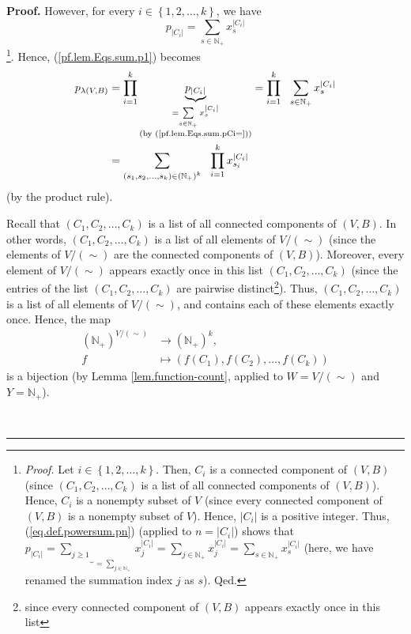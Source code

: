 \documentclass[numbers=enddot,12pt,final,onecolumn,notitlepage]{scrartcl}%
\theoremstyle{definition}
\newenvironment{proof}[1][Proof]{\noindent\textbf{#1.} }{\ \rule{0.5em}{0.5em}}
\newenvironment{verlong}{}{}
\let\sumnonlimits\sum
\let\prodnonlimits\prod
\renewcommand{\sum}{\sumnonlimits\limits}
\renewcommand{\prod}{\prodnonlimits\limits}
\begin{document}
\begin{verlong}
\begin{proof}
However, for every $i\in\left\{  1,2,\ldots,k\right\}  $, we have
\begin{equation}
p_{\left\vert C_{i}\right\vert }=\sum_{s\in\mathbb{N}_{+}}x_{s}^{\left\vert
C_{i}\right\vert } \label{pf.lem.Eqs.sum.pCi=}%
\end{equation}
\footnote{\textit{Proof.} Let $i\in\left\{  1,2,\ldots,k\right\}  $. Then,
$C_{i}$ is a connected component of $\left(  V,B\right)  $ (since $\left(
C_{1},C_{2},\ldots,C_{k}\right)  $ is a list of all connected components of
$\left(  V,B\right)  $). Hence, $C_{i}$ is a nonempty subset of $V$ (since
every connected component of $\left(  V,B\right)  $ is a nonempty subset of
$V$). Hence, $\left\vert C_{i}\right\vert $ is a positive integer. Thus,
(\ref{eq.def.powersum.pn}) (applied to $n=\left\vert C_{i}\right\vert $) shows
that $p_{\left\vert C_{i}\right\vert }=\underbrace{\sum_{j\geq1}}_{=\sum
_{j\in\mathbb{N}_{+}}}x_{j}^{\left\vert C_{i}\right\vert }=\sum_{j\in
\mathbb{N}_{+}}x_{j}^{\left\vert C_{i}\right\vert }=\sum_{s\in\mathbb{N}_{+}%
}x_{s}^{\left\vert C_{i}\right\vert }$ (here, we have renamed the summation
index $j$ as $s$). Qed.}. Hence, (\ref{pf.lem.Eqs.sum.p1}) becomes%
\begin{align}
p_{\lambda\left(  V,B\right)  }  &  =\prod_{i=1}^{k}\underbrace{p_{\left\vert
C_{i}\right\vert }}_{\substack{=\sum_{s\in\mathbb{N}_{+}}x_{s}^{\left\vert
C_{i}\right\vert }\\\text{(by (\ref{pf.lem.Eqs.sum.pCi=}))}}}=\prod_{i=1}%
^{k}\ \ \sum_{s\in\mathbb{N}_{+}}x_{s}^{\left\vert C_{i}\right\vert
}\nonumber\\
&  =\sum_{\left(  s_{1},s_{2},\ldots,s_{k}\right)  \in\left(  \mathbb{N}%
_{+}\right)  ^{k}}\ \ \prod_{i=1}^{k}x_{s_{i}}^{\left\vert C_{i}\right\vert }
\label{pf.lem.Eqs.sum.p2}%
\end{align}
(by the product rule).

Recall that $\left(  C_{1},C_{2},\ldots,C_{k}\right)  $ is a list of all
connected components of $\left(  V,B\right)  $. In other words, $\left(
C_{1},C_{2},\ldots,C_{k}\right)  $ is a list of all elements of $V/\left(
\sim\right)  $ (since the elements of $V/\left(  \sim\right)  $ are the
connected components of $\left(  V,B\right)  $). Moreover, every element of
$V/\left(  \sim\right)  $ appears exactly once in this list $\left(
C_{1},C_{2},\ldots,C_{k}\right)  $ (since the entries of the list $\left(
C_{1},C_{2},\ldots,C_{k}\right)  $ are pairwise distinct\footnote{since every
connected component of $\left(  V,B\right)  $ appears exactly once in this
list}). Thus, $\left(  C_{1},C_{2},\ldots,C_{k}\right)  $ is a list of all
elements of $V/\left(  \sim\right)  $, and contains each of these elements
exactly once. Hence, the map%
\begin{align*}
\left(  \mathbb{N}_{+}\right)  ^{V/\left(  \sim\right)  }  &  \rightarrow
\left(  \mathbb{N}_{+}\right)  ^{k},\\
f  &  \mapsto\left(  f\left(  C_{1}\right)  ,f\left(  C_{2}\right)
,\ldots,f\left(  C_{k}\right)  \right)
\end{align*}
is a bijection (by Lemma \ref{lem.function-count}, applied to $W=V/\left(
\sim\right)  $ and $Y=\mathbb{N}_{+}$).


\end{proof}
\end{verlong}
\end{document}
